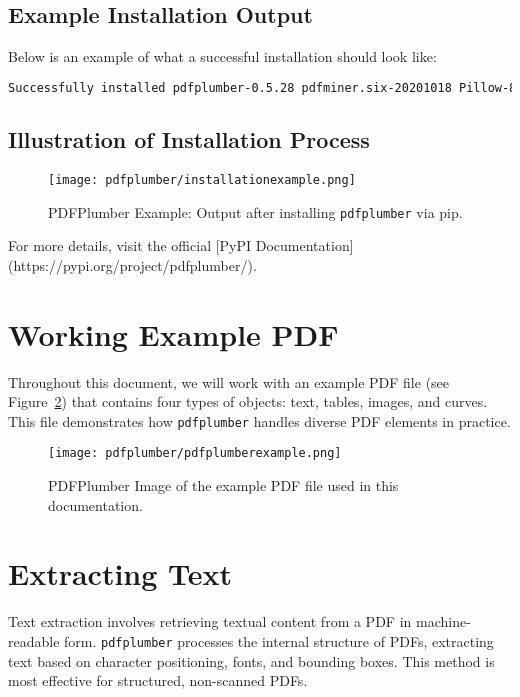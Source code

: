 \subsection{Example Installation Output}
Below is an example of what a successful installation should look like:
\begin{lstlisting}[language=bash, caption={PDFPlumber Successful installation output.}]
Successfully installed pdfplumber-0.5.28 pdfminer.six-20201018 Pillow-8.2.0
\end{lstlisting}

\subsection{Illustration of Installation Process}
\begin{figure}[h!]
\centering
\texttt{[image: pdfplumber/installationexample.png]}
\caption{PDFPlumber Example: Output after installing \texttt{pdfplumber} via pip.}
\label{fig:PDFPlumber install example}
\end{figure}

For more details, visit the official [PyPI Documentation](https://pypi.org/project/pdfplumber/).
\newpage
\section{Working Example PDF}
\label{sec:example pdf}

Throughout this document, we will work with an example PDF file (see Figure~\ref{fig:PDFPlumber example pdf}) that contains four types of objects: text, tables, images, and curves. This file demonstrates how \texttt{pdfplumber} handles diverse PDF elements in practice.\cite{Singer:2022}

\begin{figure}[h!]
\centering
\texttt{[image: pdfplumber/pdfplumberexample.png]}
\caption{PDFPlumber Image of the example PDF file used in this documentation.}
\label{fig:PDFPlumber example pdf}
\end{figure}

\section{Extracting Text}
\label{sec:extracting text}

Text extraction involves retrieving textual content from a PDF in machine-readable form. \texttt{pdfplumber} processes the internal structure of PDFs, extracting text based on character positioning, fonts, and bounding boxes. This method is most effective for structured, non-scanned PDFs.\cite{Singer:2022}

